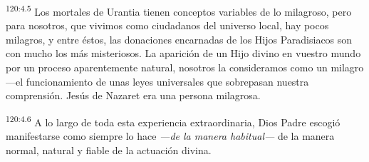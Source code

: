 \par 
\textsuperscript{120:4.5} Los mortales de Urantia tienen conceptos variables de lo milagroso, pero para nosotros, que vivimos como ciudadanos del universo local, hay pocos milagros, y entre éstos, las donaciones encarnadas de los Hijos Paradisiacos son con mucho los más misteriosos. La aparición de un Hijo divino en vuestro mundo por un proceso aparentemente natural, nosotros la consideramos como un milagro ---el funcionamiento de unas leyes universales que sobrepasan nuestra comprensión. Jesús de Nazaret era una persona milagrosa.

\par 
\textsuperscript{120:4.6} A lo largo de toda esta experiencia extraordinaria, Dios Padre escogió manifestarse como siempre lo hace \textit{{}---de la manera habitual---} de la manera normal, natural y fiable de la actuación divina.